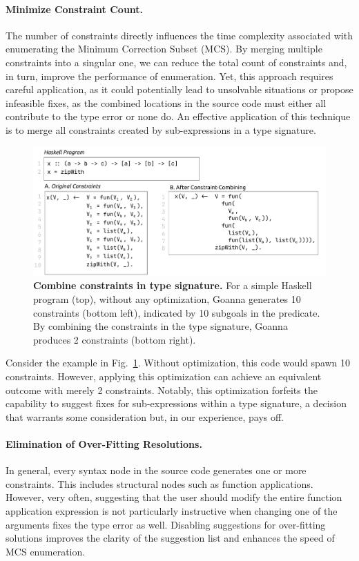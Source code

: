     \paragraph{Minimize Constraint Count.}
    The number of constraints directly influences the time complexity associated with enumerating the Minimum Correction Subset (MCS). By merging multiple constraints into a singular one, we can reduce the total count of constraints and, in turn, improve the performance of enumeration. Yet, this approach requires careful application, as it could potentially lead to unsolvable situations or propose infeasible fixes, as the combined locations in the source code must either all contribute to the type error or none do. An effective application of this technique is to merge all constraints created by sub-expressions in a type signature.

   \begin{figure}[ht!]
        \centering
        \includegraphics[width=\linewidth]{images/Combine-Constraints}
        \caption[Combine constraints in type signature]{\textbf{Combine constraints in type signature.} For a simple Haskell program (top),  without any optimization, Goanna generates 10 constraints (bottom left), indicated by 10 subgoals in the predicate. By combining the constraints in the type signature, Goanna produces 2 constraints (bottom right).}
        \label{fig:combine-constraints}
    \end{figure}

    Consider the example in Fig.~\ref{fig:combine-constraints}. Without optimization, this code would spawn 10 constraints. However, applying this optimization can achieve an equivalent outcome with merely 2 constraints. Notably, this optimization forfeits the capability to suggest fixes for sub-expressions within a type signature, a decision that warrants some consideration but, in our experience, pays off.

    \paragraph{Elimination of Over-Fitting Resolutions.}
    In general, every syntax node in the source code generates one or more constraints. This includes structural nodes such as function applications. However, very often, suggesting that the user should modify the entire function application expression is not particularly instructive when changing one of the arguments fixes the type error as well. Disabling suggestions for over-fitting solutions improves the clarity of the suggestion list and enhances the speed of MCS enumeration.
   

